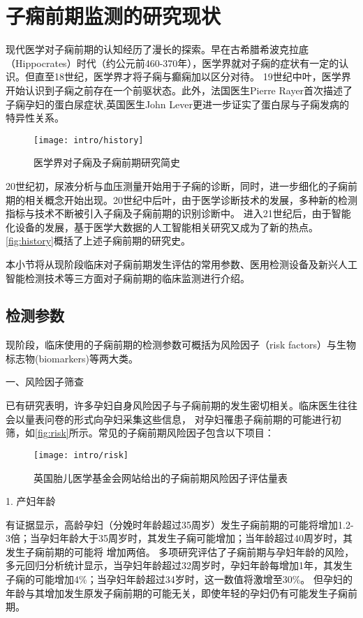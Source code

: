 \section{子痫前期监测的研究现状}
现代医学对子痫前期的认知经历了漫长的探索\cite{BJOG2016}。早在古希腊希波克拉底（Hippocrates）时代（约公元前460-370年），医学界就对子痫的症状有一定的认识。但直至18世纪，医学界才将子痫与癫痫加以区分对待。
19世纪中叶，医学界开始认识到子痫之前存在一个前驱状态。此外，法国医生Pierre Rayer首次描述了子痫孕妇的蛋白尿症状,英国医生John Lever更进一步证实了蛋白尿与子痫发病的特异性关系。
\begin{figure}[htbp]
    \centering
    \texttt{[image: intro/history]}
    \caption{\label{fig:history}医学界对子痫及子痫前期研究简史}
\end{figure}
20世纪初，尿液分析与血压测量开始用于子痫的诊断，同时，进一步细化的子痫前期的相关概念开始出现。20世纪中后叶，由于医学诊断技术的发展，多种新的检测指标与技术不断被引入子痫及子痫前期的识别诊断中。
进入21世纪后，由于智能化设备的发展，基于医学大数据的人工智能相关研究又成为了新的热点。\autoref{fig:history}概括了上述子痫前期的研究史。

本小节将从现阶段临床对子痫前期发生评估的常用参数、医用检测设备及新兴人工智能检测技术等三方面对子痫前期的临床监测进行介绍。
\subsection{检测参数}
现阶段，临床使用的子痫前期的检测参数可概括为风险因子（risk factors）与生物标志物(biomarkers)等两大类。

一、风险因子筛查

已有研究表明，许多孕妇自身风险因子与子痫前期的发生密切相关\cite{Magee2008,FIGO,Lowe2015,Heazell2010}。临床医生往往会以量表问卷的形式向孕妇采集这些信息，
对孕妇罹患子痫前期的可能进行初筛\cite{risks}，如\autoref{fig:risk}所示。常见的子痫前期风险因子包含以下项目：
\begin{figure}[htbp]
    \centering
    \texttt{[image: intro/risk]}
    \caption[英国胎儿医学基金会网站给出的子痫前期风险因子评估量表]{\label{fig:risk}英国胎儿医学基金会网站给出的子痫前期风险因子评估量表\cite{risks}}
\end{figure}

1. 产妇年龄

有证据显示，高龄孕妇（分娩时年龄超过35周岁）发生子痫前期的可能将增加1.2-3倍；当孕妇年龄大于35周岁时，其发生子痫可能增加；当年龄超过40周岁时，其发生子痫前期的可能将
增加两倍\cite{Duckitt2005,FIGO,Yogev2010}。
多项研究评估了子痫前期与孕妇年龄的风险，多元回归分析统计显示，当孕妇年龄超过32周岁时，孕妇年龄每增加1年，其发生子痫的可能增加4\%；当孕妇年龄超过34岁时，这一数值将激增至30\%。
但孕妇的年龄与其增加发生原发子痫前期的可能无关，即使年轻的孕妇仍有可能发生子痫前期\cite{Duckitt2005,Poon2010}。


